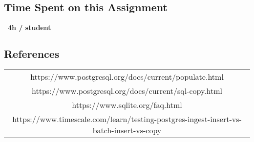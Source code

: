 \documentclass[11pt]{scrartcl}
\begin{document}
\subsection*{Time Spent on this Assignment}

 \textbf{~4h / student}

\subsection*{References}

\begin{table}[H]
  \centering
  \begin{tabular}{c}
    \hline
    https://www.postgresql.org/docs/current/populate.html \tabularnewline
    https://www.postgresql.org/docs/current/sql-copy.html \tabularnewline
    https://www.sqlite.org/faq.html \tabularnewline
    https://www.timescale.com/learn/testing-postgres-ingest-insert-vs-batch-insert-vs-copy \tabularnewline
    \hline
  \end{tabular}
\end{table}
\end{document}
